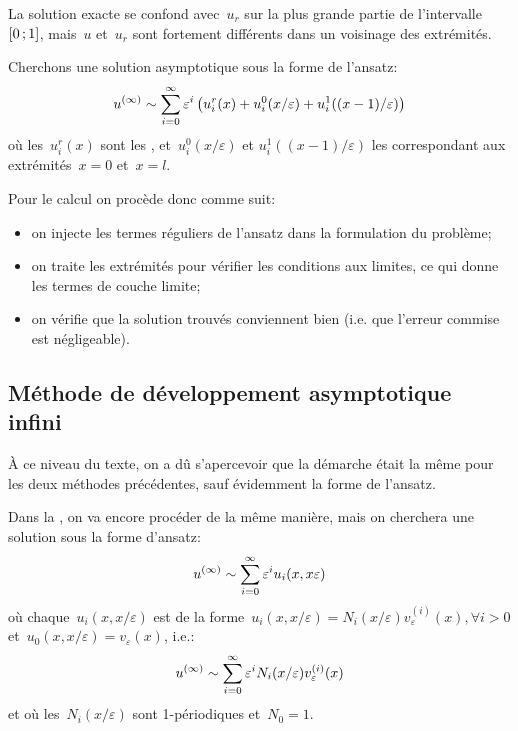 La solution exacte se confond avec~$u_r$ sur la plus grande partie de l'intervalle~$\mathopen{[}0\,;1\mathclose{]}$,
mais~$u$ et~$u_r$ sont fortement différents dans un voisinage des extrémités.

\medskip
Cherchons une solution asymptotique sous la forme de l'ansatz:
\begin{equation}
u^{(\infty)} \sim \displaystyle\sum_{i=0}^\infty \varepsilon^i\left( u_i^r(x) + u_i^0(x/\varepsilon)
+u_i^1((x-1)/\varepsilon) \right)
\end{equation}
où les~$u_i^r(x)$ sont les , et~$u_i^0(x/\varepsilon)$ et
$u_i^1((x-1)/\varepsilon)$ les  correspondant aux
extrémités~$x=0$ et~$x=l$.

\medskip
Pour le calcul on procède donc comme suit:
\begin{itemize}
  \item on injecte les termes réguliers de l'ansatz dans la formulation du problème;
  \item on traite les extrémités pour vérifier les conditions aux limites, ce qui donne les termes de couche
	limite;
  \item on vérifie que la solution trouvés conviennent bien (i.e. que l'erreur commise est négligeable).
\end{itemize}


\medskip
\subsection{Méthode de développement asymptotique infini}
À ce niveau du texte, on a dû s'apercevoir que la démarche était la même
pour les deux méthodes précédentes, sauf évidemment la forme de l'ansatz.

Dans la , on va encore procéder
de la même manière, mais on cherchera une solution sous la forme d'ansatz:
\begin{equation}
u^{(\infty)} \sim \displaystyle\sum_{i=0}^\infty \varepsilon^i u_i(x,x\varepsilon)
\end{equation}
où chaque~$u_i(x,x/\varepsilon)$ est de la forme~$u_i(x,x/\varepsilon)=N_i(x/\varepsilon)v_\varepsilon^{(i)}(x),
\forall i>0$ et~$u_0(x,x/\varepsilon)=v_\varepsilon(x)$, i.e.:
\begin{equation}
u^{(\infty)} \sim \displaystyle\sum_{i=0}^\infty \varepsilon^i N_i(x/\varepsilon)v_\varepsilon^{(i)}(x)
\end{equation}
et où les~$N_i(x/\varepsilon)$ sont 1-périodiques et~$N_0=1$.

